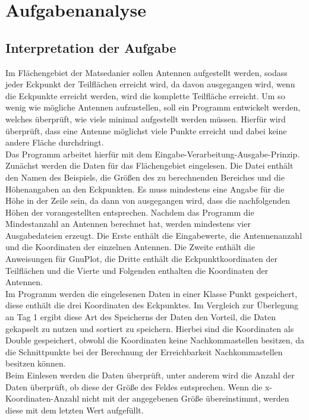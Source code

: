 \chapter{Aufgabenanalyse}\label{ch:aufgabenanalyse}


\section{Interpretation der Aufgabe}\label{sec:interpretation-der-aufgabe}
Im Flächengebiet der Matsedanier sollen Antennen aufgestellt werden, sodass jeder Eckpunkt der Teilflächen erreicht wird, da davon ausgegangen wird, wenn die Eckpunkte erreicht werden, wird die komplette Teilfläche erreicht.
Um so wenig wie mögliche Antennen aufzustellen, soll ein Programm entwickelt werden, welches überprüft, wie viele minimal aufgestellt werden müssen.
Hierfür wird überprüft, dass eine Antenne möglichst viele Punkte erreicht und dabei keine andere Fläche durchdringt.
\\
Das Programm arbeitet hierfür mit dem Eingabe-Verarbeitung-Ausgabe-Prinzip.
Zunächst werden die Daten für das Flächengebiet eingelesen.
Die Datei enthält den Namen des Beispiels, die Größen des zu berechnenden Bereiches und die Höhenangaben an den Eckpunkten.
Es muss mindestens eine Angabe für die Höhe in der Zeile sein, da dann von ausgegangen wird, dass die nachfolgenden Höhen der vorangestellten entsprechen.
Nachdem das Programm die Mindestanzahl an Antennen berechnet hat, werden mindestens vier Ausgabedateien erzeugt.
Die Erste enthält die Eingabewerte, die Antennenanzahl und die Koordinaten der einzelnen Antennen.
Die Zweite enthält die Anweisungen für GnuPlot, die Dritte enthält die Eckpunktkoordinaten der Teilflächen und die Vierte und Folgenden enthalten die Koordinaten der Antennen.
\\
Im Programm werden die eingelesenen Daten in einer Klasse Punkt gespeichert, diese enthält die drei Koordinaten des Eckpunktes.
Im Vergleich zur Überlegung an Tag 1 ergibt diese Art des Speicherns der Daten den Vorteil, die Daten gekapselt zu nutzen und sortiert zu speichern.
Hierbei sind die Koordinaten als Double gespeichert, obwohl die Koordinaten keine Nachkommastellen besitzen, da die Schnittpunkte bei der Berechnung der Erreichbarkeit Nachkommastellen besitzen können.
\\
Beim Einlesen werden die Daten überprüft, unter anderem wird die Anzahl der Daten überprüft, ob diese der Größe des Feldes entsprechen.
Wenn die x-Koordinaten-Anzahl nicht mit der angegebenen Größe übereinstimmt, werden diese mit dem letzten Wert aufgefüllt.
